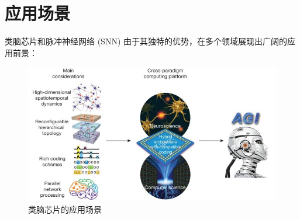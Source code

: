 \documentclass[12pt, a4paper, oneside]{ctexart}
\numberwithin{equation}{section}  %
\begin{document}
\section{应用场景}
类脑芯片和脉冲神经网络 (SNN) 由于其独特的优势，在多个领域展现出广阔的应用前景\cite{ref9,ref10}：
\begin{figure}[htbp]
    \centering
    \includegraphics[width=\linewidth]{6.jpeg}
    \caption{类脑芯片的应用场景}
\end{figure}
\end{document}
